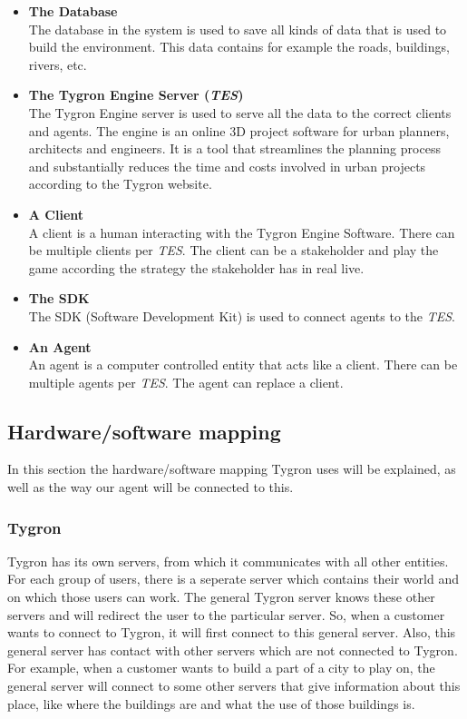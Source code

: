 \begin{itemize}
	\item \textbf{The Database} \\ 
	The database in the system is used to save all kinds of data that is used to build the environment. This data contains for example the roads, buildings, rivers, etc.
	\item \textbf{The Tygron Engine Server (\textit{TES})} \\ 
	The Tygron Engine server is used to serve all the data to the correct clients and agents. The engine is an online 3D project software for urban planners, architects and engineers. It is a tool that streamlines the planning process and substantially reduces the time and costs involved in urban projects according to the Tygron website.
	\item \textbf{A Client} \\
	A client is a human interacting with the Tygron Engine Software. There can be multiple clients per \textit{TES}. The client can be a stakeholder and play the game according the strategy the stakeholder has in real live. 
	\item \textbf{The SDK} \\
	The SDK (Software Development Kit) is used to connect agents to the \textit{TES}.
	\item \textbf{An Agent} \\
	An agent is a computer controlled entity that acts like a client. There can be multiple agents per \textit{TES}. The agent can replace a client.
\end{itemize}

\newpage
\subsection{Hardware/software mapping}
In this section the hardware/software mapping Tygron uses will be explained, as well as the way our agent will be connected to this.

\subsubsection{Tygron}
Tygron has its own servers, from which it communicates with all other entities. For each group of users, there is a seperate server which contains their world and on which those users can work. The general Tygron server knows these other servers and will redirect the user to the particular server. So, when a customer wants to connect to Tygron, it will first connect to this general server. Also, this general server has contact with other servers which are not connected to Tygron. For example, when a customer wants to build a part of a city to play on, the general server will connect to some other servers that give information about this place, like where the buildings are and what the use of those buildings is. 


